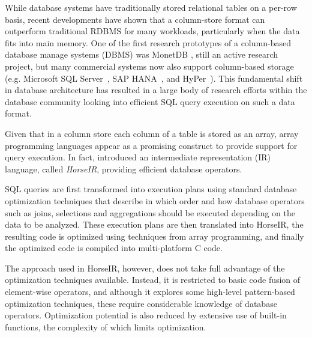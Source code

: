 While database systems have traditionally stored relational tables on a per-row
basis, recent developments have shown that a column-store format can outperform
traditional RDBMS for many workloads, particularly when the data fits into
main memory.
One of the first research prototypes of a column-based database manage systems
(DBMS) was MonetDB \cite{IdreosS2012}, still an active research project, but
many commercial systems now also support column-based storage (e.g.
Microsoft SQL Server~\cite{msqlserver},
SAP HANA~\cite{FarberF2012}, and
HyPer~\cite{Neumann2011:HyPer}).
This fundamental shift in database architecture has resulted in a large body of
research efforts within the database community looking into efficient SQL query
execution on such a data format.

Given that in a column store each column of a table is stored as an array,
array programming languages appear as a promising construct to provide support
for query execution. In fact, \OldPaperAuthor introduced an intermediate
representation (IR) language, called \textit{HorseIR}, providing efficient
database operators.

SQL queries are first transformed into execution plans using standard database
optimization techniques that describe in which order and how database operators
such as joins, selections and aggregations should be executed depending on the
data to be analyzed. These execution plans are then translated into HorseIR,
the resulting code is optimized using techniques from array programming, and
finally the optimized code is compiled into multi-platform C code.

The approach used in HorseIR, however, does not take full advantage of the
optimization techniques available. Instead, it is restricted to basic code
fusion of element-wise operators, and although it explores some high-level
pattern-based optimization techniques, these require considerable knowledge of
database operators.  Optimization potential is also reduced by extensive use of
built-in functions, the complexity of which limits optimization.

